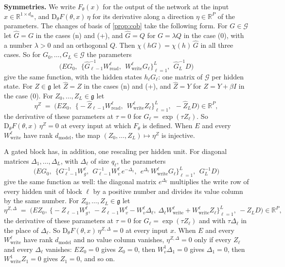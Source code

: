 \documentclass[10pt]{article}
\theoremstyle{definition}
\theoremstyle{remark}
\newcommand{\R}{\mathbb{R}}
\newcommand{\Wread}{W_{\mathrm{read}}}
\newcommand{\Wwrite}{W_{\mathrm{write}}}
\newcommand{\dm}{d_{\mathrm{model}}}
\newcommand{\Der}{\mathrm{D}}
\newcommand{\G}{\mathcal{G}}
\newcommand{\para}[1]{\smallskip\noindent\textbf{#1}\hspace{0.5em}}
\begin{document}
\para{Symmetries.} We write $F_\theta(x)$ for the output of the network at the input $x \in \R^{1\times d_{\mathrm{in}}}$, and $\Der_\theta F(\theta, x)\,\eta$ for its derivative along a direction $\eta \in \R^P$ of the parameters. The changes of basis of \cref{prop:cob} take the following form. For $G \in \G$ let $\widehat G = G$ in the cases (n) and (+), and $\widehat G = Q$ for $G = \lambda Q$ in the case (0), with a number $\lambda > 0$ and an orthogonal $Q$. Then $\chi(hG) = \chi(h)\,\widehat G$ in all three cases. So for $G_0, \dots, G_L \in \G$ the parameters
\[
\Big(EG_0,\ \ \big\{\widehat G_{\ell-1}^{-1}\Wread^{\ell},\ \ \Wwrite^{\ell}G_\ell\big\}_{\ell=1}^{L},\ \ \widehat G_L^{-1}D\Big)
\]
give the same function, with the hidden states $h_\ell G_\ell$: one matrix of $\G$ per hidden state. For $Z \in \mathfrak g$ let $\widehat Z = Z$ in the cases (n) and (+), and $\widehat Z = Y$ for $Z = Y + \beta I$ in the case (0). For $Z_0, \dots, Z_L \in \mathfrak g$ let
\begin{equation}\label{eq:e0eta}
\eta^{Z} \;=\; \Big(EZ_0,\ \ \big\{-\widehat Z_{\ell-1}\Wread^{\ell},\ \ \Wwrite^{\ell}Z_\ell\big\}_{\ell=1}^{L},\ \ -\widehat Z_LD\Big) \in \R^P ,
\end{equation}
the derivative of these parameters at $\tau = 0$ for $G_\ell = \exp(\tau Z_\ell)$. So $\Der_\theta F(\theta, x)\,\eta^{Z} = 0$ at every input at which $F_\theta$ is defined. When $E$ and every $\Wwrite^{\ell}$ have rank $\dm$, the map $(Z_0, \dots, Z_L) \mapsto \eta^{Z}$ is injective.

A gated block has, in addition, one rescaling per hidden unit. For diagonal matrices $\Delta_1, \dots, \Delta_L$, with $\Delta_\ell$ of size $q_\ell$, the parameters
\[
\Big(EG_0,\ \ \big\{G_{\ell-1}^{-1}W_g^{\ell},\ \ G_{\ell-1}^{-1}W_v^{\ell}\,e^{-\Delta_\ell},\ \ e^{\Delta_\ell}\,\Wwrite^{\ell}G_\ell\big\}_{\ell=1}^{L},\ \ G_L^{-1}D\Big)
\]
give the same function as well: the diagonal matrix $e^{\Delta_\ell}$ multiplies the write row of every hidden unit of block $\ell$ by a positive number and divides its value column by the same number. For $Z_0, \dots, Z_L \in \mathfrak g$ let
\begin{equation}\label{eq:gteta}
\eta^{Z,\Delta} \;=\; \Big(EZ_0,\ \big\{-Z_{\ell-1}W_g^{\ell},\ -Z_{\ell-1}W_v^{\ell} - W_v^{\ell}\Delta_\ell,\ \Delta_\ell\Wwrite^{\ell} + \Wwrite^{\ell}Z_\ell\big\}_{\ell=1}^{L},\ -Z_LD\Big) \in \R^P ,
\end{equation}
the derivative of these parameters at $\tau = 0$ for $G_\ell = \exp(\tau Z_\ell)$ and with $\tau\Delta_\ell$ in the place of $\Delta_\ell$. So $\Der_\theta F(\theta, x)\,\eta^{Z,\Delta} = 0$ at every input $x$. When $E$ and every $\Wwrite^{\ell}$ have rank $\dm$ and no value column vanishes, $\eta^{Z,\Delta} = 0$ only if every $Z_\ell$ and every $\Delta_\ell$ vanishes: $EZ_0 = 0$ gives $Z_0 = 0$, then $W_v^{1}\Delta_1 = 0$ gives $\Delta_1 = 0$, then $\Wwrite^{1}Z_1 = 0$ gives $Z_1 = 0$, and so on.
\end{document}
